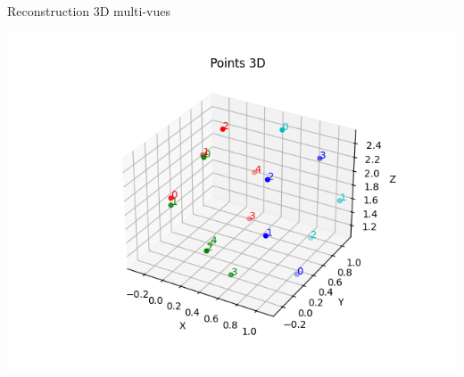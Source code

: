 \begin{frame}{Reconstruction 3D multi-vues}
  \begin{minipage}{0.6\linewidth}
    \includegraphics[width=\linewidth]{capture/cloud.png}
  \end{minipage}
  \hfill
  \begin{minipage}{0.3\linewidth}
    \begin{minipage}{0.4\linewidth}
\\[0.5em]

\end{minipage}
\end{minipage}
\end{frame}
